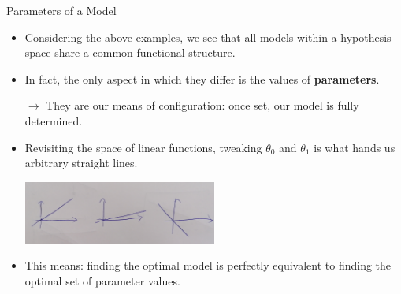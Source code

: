 \documentclass[11pt,compress,t,notes=noshow, xcolor=table]{beamer}
\begin{document}
\begin{vbframe}{Parameters of a Model}

\begin{itemize}

  
  \item Considering the above examples, we see that all models within a 
  hypothesis space share a common functional structure.
  
  \item In fact, the only aspect in which they differ is the values of 
  \textbf{parameters}.
  
  $\rightarrow$ They are our means of configuration: once set, our model is 
  fully determined.
  
  \item Revisiting the space of linear functions, tweaking $\theta_0$ and
  $\theta_1$ is what hands us arbitrary straight lines.
  
  \begin{center}
    \includegraphics[width = 0.5\textwidth]{figure_man/lines.jpg} 
  \end{center}
  
  \framebreak
  
  \item This means: finding the optimal model is perfectly equivalent to 
  finding the optimal set of parameter values.
  

\end{itemize}
\end{vbframe}
\end{document}

